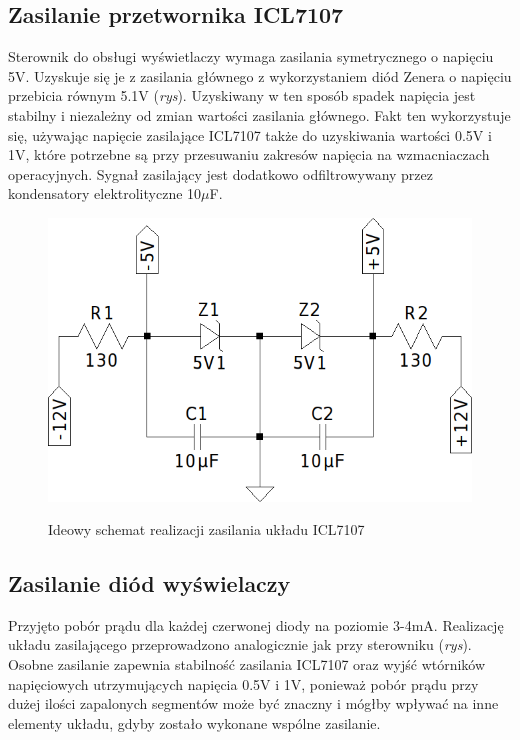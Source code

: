\documentclass[12pt]{article}
\begin{document}
\subsection{Zasilanie przetwornika ICL7107}
Sterownik do obsługi wyświetlaczy wymaga zasilania symetrycznego o napięciu 5V. Uzyskuje się je z zasilania głównego z wykorzystaniem diód Zenera o napięciu przebicia równym 5.1V (\textit{rys}). Uzyskiwany w ten sposób spadek napięcia jest stabilny i niezależny od zmian wartości zasilania głównego. Fakt ten wykorzystuje się, używając napięcie zasilające ICL7107 także do uzyskiwania wartości 0.5V i 1V, które potrzebne są przy przesuwaniu zakresów napięcia na wzmacniaczach operacyjnych. Sygnał zasilający jest dodatkowo odfiltrowywany przez kondensatory elektrolityczne 10$\mu$F.
\begin{figure}[h]
\centering
\includegraphics[scale=0.5]{icl_power_supply.png}
\label{icl_power_supply}
\caption{Ideowy schemat realizacji zasilania układu ICL7107}
\end{figure}

\subsection{Zasilanie diód wyświelaczy}
Przyjęto pobór prądu dla każdej czerwonej diody na poziomie 3-4mA. Realizację układu zasilającego przeprowadzono analogicznie jak przy sterowniku (\textit{rys}). Osobne zasilanie zapewnia stabilność zasilania ICL7107 oraz wyjść wtórników napięciowych utrzymujących napięcia 0.5V i 1V, ponieważ pobór prądu przy dużej ilości zapalonych segmentów może być znaczny i mógłby wpływać na inne elementy układu, gdyby zostało wykonane wspólne zasilanie. \\
\end{document}
